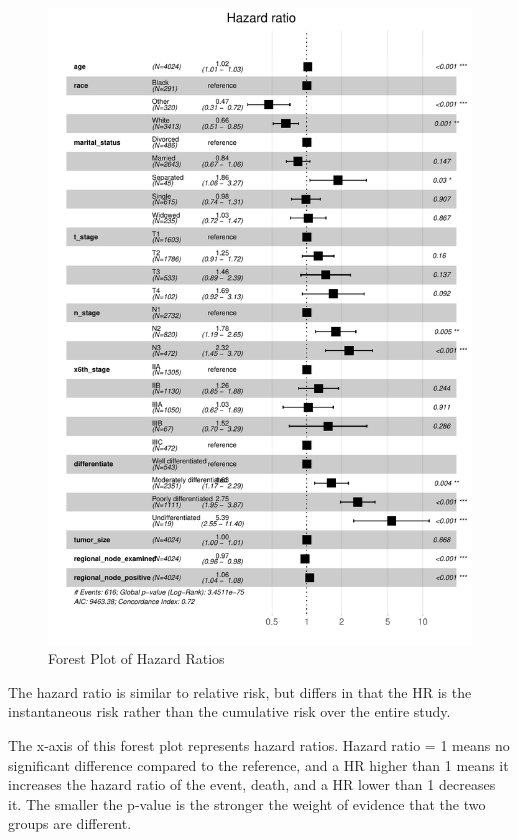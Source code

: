 \documentclass[
]{article}
\begin{document}
\begin{figure}
\includegraphics[width=1\linewidth]{Appendix_files/figure-latex/forest_plot-1} \caption{Forest Plot of Hazard Ratios}\label{fig:forest_plot}
\end{figure}

The hazard ratio is similar to relative risk, but differs in that the HR
is the instantaneous risk rather than the cumulative risk over the
entire study.

The x-axis of this forest plot represents hazard ratios. Hazard ratio =
1 means no significant difference compared to the reference, and a HR
higher than 1 means it increases the hazard ratio of the event, death,
and a HR lower than 1 decreases it. The smaller the p-value is the
stronger the weight of evidence that the two groups are different.
\end{document}
